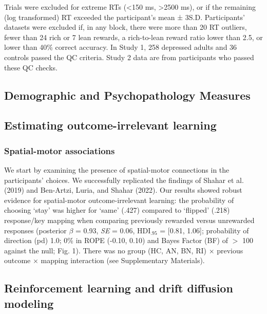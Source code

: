 \documentclass[
  man,floatsintext]{apa6}
\begin{document}
Trials were excluded for extreme RTs (\textless150 ms, \textgreater2500 ms), or if the remaining (log transformed) RT exceeded the participant's mean ± 3S.D. Participants' datasets were excluded if, in any block, there were more than 20 RT outliers, fewer than 24 rich or 7 lean rewards, a rich-to-lean reward ratio lower than 2.5, or lower than 40\% correct accuracy. In Study 1, 258 depressed adults and 36 controls passed the QC criteria. Study 2 data are from participants who passed these QC checks.

\hypertarget{demographic-and-psychopathology-measures}{%
\subsection{Demographic and Psychopathology Measures}\label{demographic-and-psychopathology-measures}}

\hypertarget{estimating-outcome-irrelevant-learning}{%
\subsection{Estimating outcome-irrelevant learning}\label{estimating-outcome-irrelevant-learning}}

\hypertarget{spatial-motor-associations}{%
\subsubsection{Spatial-motor associations}\label{spatial-motor-associations}}

We start by examining the presence of spatial-motor connections in the participants' choices. We successfully replicated the findings of Shahar et al. (2019) and Ben-Artzi, Luria, and Shahar (2022). Our results showed robust evidence for spatial-motor outcome-irrelevant learning: the probability of choosing `stay' was higher for `same' (.427) compared to `flipped' (.218) response/key mapping when comparing previously rewarded versus unrewarded responses (posterior \(\beta\) = 0.93, \emph{SE} = 0.06, \(\text{HDI}_{.95}\) = {[}0.81, 1.06{]}; probability of direction (pd) 1.0; 0\% in ROPE (-0.10, 0.10) and Bayes Factor (BF) of \(>\) 100 against the null; Fig. 1). There was no group (HC, AN, BN, RI) \(\times\) previous outcome \(\times\) mapping interaction (see Supplementary Materials).

\hypertarget{reinforcement-learning-and-drift-diffusion-modeling}{%
\subsection{Reinforcement learning and drift diffusion modeling}\label{reinforcement-learning-and-drift-diffusion-modeling}}
\end{document}
